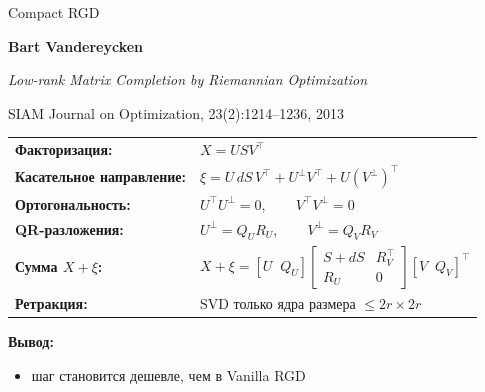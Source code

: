 \documentclass[aspectratio=169,xcolor=dvipsnames]{beamer}
\begin{document}
\begin{frame}{Compact RGD}
\footnotesize
\begin{center}
\textbf{Bart Vandereycken}

\vspace{0.08cm}
\textit{Low-rank Matrix Completion by Riemannian Optimization}

\vspace{0.08cm}
SIAM Journal on Optimization, 23(2):1214--1236, 2013
\end{center}

\vspace{0.1cm}
\renewcommand{\arraystretch}{1.25}
\begin{center}
\begin{tabular}{@{}>{\raggedright\arraybackslash\bfseries}p{}p{}@{}}
Факторизация: &
$\displaystyle X = U S V^{\top}$
\\
Касательное направление: &
$\displaystyle \xi = U\, dS\, V^{\top} + U^{\perp} V^{\top} + U (V^{\perp})^{\top}$
\\
Ортогональность: &
$\displaystyle U^{\top}U^{\perp} = 0,\qquad V^{\top}V^{\perp} = 0$
\\
QR-разложения: &
$\displaystyle U^{\perp} = Q_U R_U,\qquad V^{\perp} = Q_V R_V$
\\
Сумма $X + \xi$: &
$\displaystyle
X + \xi =
[U\;\;Q_U]
\begin{bmatrix}
S + dS & R_V^{\top} \\
R_U & 0
\end{bmatrix}
[V\;\;Q_V]^{\top}$
\\
Ретракция: &
$\displaystyle \text{SVD только ядра размера } \le 2r\times 2r$
\end{tabular}
\end{center}

\textbf{Вывод:}
\begin{itemize}
\item шаг становится дешевле, чем в Vanilla RGD
\end{itemize}
\end{frame}
\end{document}
